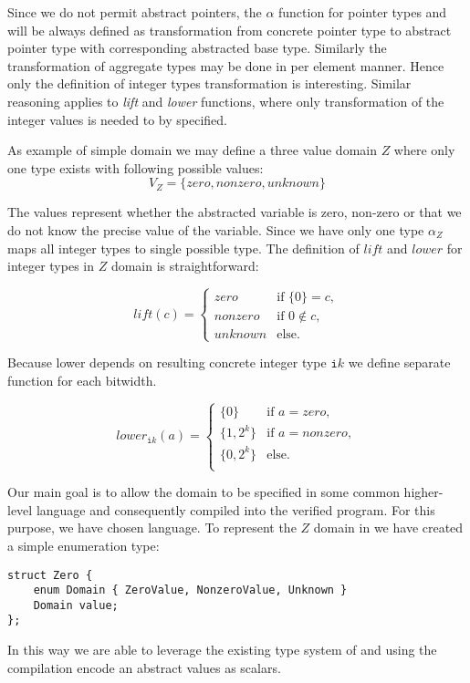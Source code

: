 Since we do not permit abstract pointers, the $\alpha$ function for pointer types and will be
always defined as transformation from concrete pointer type to abstract pointer
type with corresponding abstracted base type. Similarly the transformation of
aggregate types may be done in per element manner. Hence only the definition of
integer types transformation is interesting. Similar reasoning applies to
\textit{lift} and \textit{lower} functions, where only transformation of the
integer values is needed to by specified.

As example of simple domain we may define a three value domain $Z$ where only
one type exists with following possible values:
\[ V_{Z} = \{ \textit{zero}, \textit{nonzero}, \textit{unknown} \}\]


The values represent whether the abstracted variable is zero, non-zero or that we do
not know the precise value of the variable. Since we have only one type
$\alpha_{Z}$ maps all integer types to single possible type.
The definition of $\textit{lift}$ and $\textit{lower}$ for integer
types in $Z$ domain is straightforward:

\[
  lift(c) =
  \begin{cases}
    \textit{zero}    & \text{if } \{0\} = c, \\
    \textit{nonzero} & \text{if } 0 \not \in c, \\
    \textit{unknown} & \text{else.}
  \end{cases}
\]

\noindent
Because lower depends on resulting concrete integer type $\texttt{i}k$ we define separate
function for each bitwidth.

\[
  lower_{\texttt{i}k}(a) =
  \begin{cases}
    \{0\}      & \text{if } a = \textit{zero},\\
    \{1, 2^k\} & \text{if } a = \textit{nonzero}, \\
    \{0, 2^k\} & \text{else}. \\
  \end{cases}
\]

Our main goal is to allow the domain to be specified in some common higher-level
language and consequently compiled into the verified program. For this purpose,
we have chosen \Cpp{} language. To represent the $Z$ domain in
\Cpp{} we have created a simple enumeration type:
\begin{verbatim}
struct Zero {
    enum Domain { ZeroValue, NonzeroValue, Unknown }
    Domain value;
};
\end{verbatim}
In this way we are able to leverage the existing type system of \LLVM and
using the compilation encode an abstract values as \LLVM scalars.

